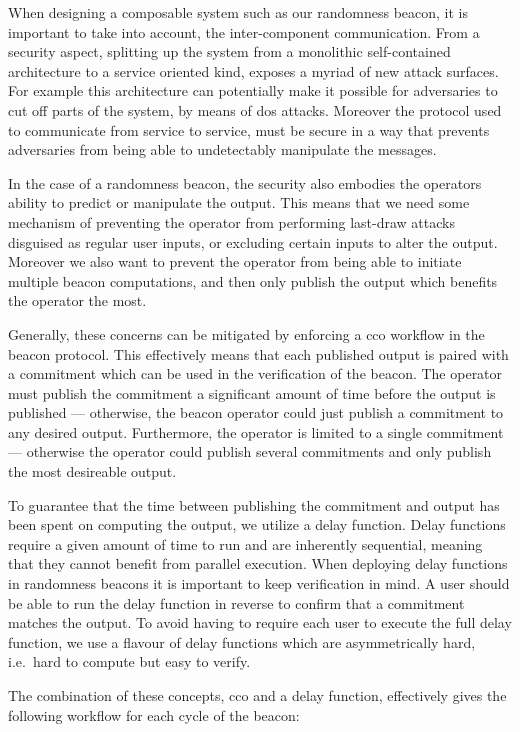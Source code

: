 When designing a composable system such as our randomness beacon, it is important to take into account, the inter-component communication.
From a security aspect, splitting up the system from a monolithic self-contained architecture to a service oriented kind, exposes a myriad of new attack surfaces.
For example this architecture can potentially make it possible for adversaries to cut off parts of the system, by means of \gls{dos} attacks.
Moreover the protocol used to communicate from service to service, must be secure in a way that prevents adversaries from being able to undetectably manipulate the messages.

In the case of a randomness beacon, the security also embodies the operators ability to predict or manipulate the output.
This means that we need some mechanism of preventing the operator from performing last-draw attacks disguised as regular user inputs, or excluding certain inputs to alter the output.
Moreover we also want to prevent the operator from being able to initiate multiple beacon computations, and then only publish the output which benefits the operator the most.

Generally, these concerns can be mitigated by enforcing a \gls{cco} workflow in the beacon protocol.
This effectively means that each published output is paired with a commitment which can be used in the verification of the beacon.
The operator must publish the commitment a significant amount of time before the output is published --- otherwise, the beacon operator could just publish a commitment to any desired output. Furthermore, the operator is limited to a single commitment --- otherwise the operator could publish several commitments and only publish the most desireable output.

To guarantee that the time between publishing the commitment and output has been spent on computing the output, we utilize a delay function.
Delay functions require a given amount of time to run and are inherently sequential, meaning that they cannot benefit from parallel execution.
When deploying delay functions in randomness beacons it is important to keep verification in mind.
A user should be able to run the delay function in reverse to confirm that a commitment matches the output.
To avoid having to require each user to execute the full delay function, we use a flavour of delay functions which are asymmetrically hard, i.e.\ hard to compute but easy to verify.

The combination of these concepts, \gls{cco} and a delay function, effectively gives the following workflow for each cycle of the beacon:

